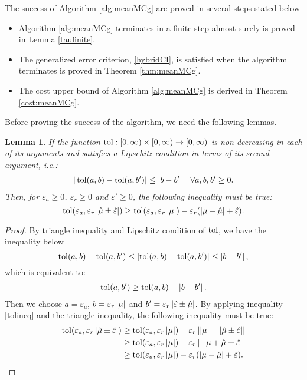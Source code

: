 \documentclass{iitthesis}
\newtheorem{lemma}[theorem]{Lemma}
\theoremstyle{definition}
\begin{document}
The success of Algorithm \ref{alg:meanMCg} are proved in several steps stated below
\begin{itemize}
\item Algorithm \ref{alg:meanMCg} terminates in a finite step almost surely is proved in Lemma \ref{taufinite}.
\item The generalized error criterion, \eqref{hybridCI}, is satisfied when the algorithm terminates is proved in Theorem \ref{thm:meanMCg}.
\item The cost upper bound of Algorithm \ref{alg:meanMCg} is derived in Theorem \ref{cost:meanMCg}.
\end{itemize}
Before proving the success of the algorithm, we need the following lemmas.

\begin{lemma}\label{cost1}
If the function $\operatorname{tol}: [0, \infty) \times [0, \infty) \to [0,\infty)$ is non-decreasing in each of its arguments and satisfies a Lipschitz condition in terms of its second argument, i.e.:
\begin{align}
|\operatorname{tol} (a,b)-\operatorname{tol} (a,b')| \leq |b-b'| \quad \forall a,b,b' \geq 0.
\end{align}
Then, for $\varepsilon_a \geq 0$, $\varepsilon_r\geq 0$ and $\varepsilon' \geq 0$, the following inequality must be true:
\begin{equation}\label{lipstol}
\operatorname{tol} (\varepsilon_a, \varepsilon_r \left \lvert \hat{\mu} \pm\hat{\varepsilon}  \right \rvert) \geq \operatorname{tol}(\varepsilon_a,\varepsilon_r \left \lvert \mu \right \rvert)-\varepsilon_r (\left \lvert \mu-\hat{\mu} \right \rvert + \hat{\varepsilon}).
\end{equation}
\end{lemma}
\begin{proof}
By triangle inequality and Lipschitz condition of $\operatorname{tol}$, we have the inequality below
 $$\operatorname{tol}(a,b) -\operatorname{tol}(a,b') \leq \left \lvert \operatorname{tol}(a,b) -\operatorname{tol}(a,b') \right \rvert \leq \left \lvert b-b' \right \rvert,$$
which is equivalent to:
\begin{align}\label{tolineq}
\operatorname{tol}(a,b') \geq \operatorname{tol}(a,b)-\left \lvert b-b' \right \rvert.
\end{align}
Then we choose $a = \varepsilon_a$, $b =\varepsilon_r\left \lvert \mu \right \rvert$ and $b'=\varepsilon_r\left \lvert \hat{\varepsilon} \pm \hat{\mu} \right \rvert$. By applying inequality \eqref{tolineq} and the triangle inequality, the following inequality must be true:
\begin{align*}
\operatorname{tol} (\varepsilon_a, \varepsilon_r \left \lvert \hat{\mu} \pm\hat{\varepsilon} \right \rvert) &
 \geq \operatorname{tol}(\varepsilon_a,\varepsilon_r \left \lvert \mu \right \rvert)-\varepsilon_r \left \lvert \left \lvert \mu \right \rvert-\left \lvert \hat{\mu}  \pm \hat{\varepsilon} \right \rvert \right \rvert \\&\geq \operatorname{tol}(\varepsilon_a,\varepsilon_r \left \lvert \mu \right \rvert)-\varepsilon_r \left \lvert -\mu+\hat{\mu} \pm \hat{\varepsilon} \right \rvert \\&
 \geq \operatorname{tol}(\varepsilon_a,\varepsilon_r \left \lvert \mu \right \rvert)-\varepsilon_r (\left \lvert \mu-\hat{\mu} \right \rvert + \hat{\varepsilon}).
\end{align*}
\end{proof}
\end{document}

